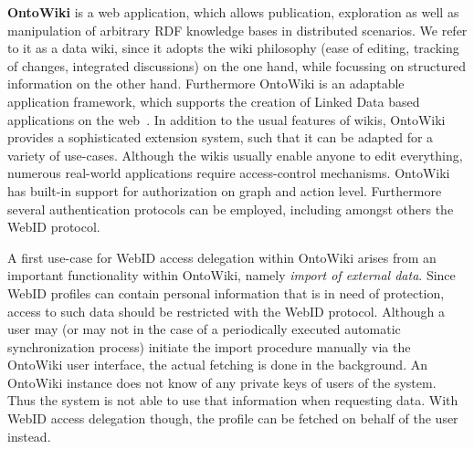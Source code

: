 \documentclass[a4paper]{llncs}
\begin{document}
\textbf{OntoWiki}
\cite{auer-s-2006-736-a} is a web application, which allows publication, exploration as well as manipulation of arbitrary RDF knowledge bases in distributed scenarios.
We refer to it as a data wiki, since it adopts the wiki philosophy (ease of editing, tracking of changes, integrated discussions) on the one hand, while focussing on structured information on the other hand.
Furthermore OntoWiki is an adaptable application framework, which supports the creation of Linked Data based applications on the web~\cite{heino-n-2009-61-a}.
In addition to the usual features of wikis, OntoWiki provides a sophisticated extension system, such that it can be adapted for a variety of use-cases.
Although the wikis usually enable anyone to edit everything, numerous real-world applications require access-control mechanisms.
OntoWiki has built-in support for authorization on graph and action level.
Furthermore several authentication protocols can be employed, including amongst others the WebID protocol.


A first use-case for WebID access delegation within OntoWiki arises from an important functionality within OntoWiki, namely \textit{import of external data}.
Since WebID profiles can contain personal information that is in need of protection, access to such data should be restricted with the WebID protocol.
Although a user may (or may not in the case of a periodically executed automatic synchronization process) initiate the import procedure manually via the OntoWiki user interface, the actual fetching is done in the background.
An OntoWiki instance does not know of any private keys of users of the system.
Thus the system is not able to use that information when requesting data.
With WebID access delegation though, the profile can be fetched on behalf of the user instead.
\end{document}
